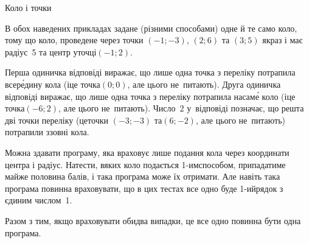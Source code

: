 \begin{problemAllDefault}{Коло і точки}
\Examples
\begin{exampleSimple}{7em}{3em}%
%
\end{exampleSimple}
\begin{exampleSimple}{7em}{3em}%
%
\end{exampleSimple}

\Notes
В обох наведених прикладах задане (різними способами) одне й те само коло, тому що коло, проведене через точки $(-1; -3)$, $(2; 6)$ та $(3; 5)$ якраз і має радіус~5 та центр у\nolinebreak[3] точці\nolinebreak[3] $(-1; 2)$.

Перша одиничка відповіді виражає, що лише одна точка з переліку потрапила всер\'{е}\-дину кола (і\nolinebreak[3] це точка\nolinebreak[3] $(0; 0)$, але цього не~питають). Друга одиничка відповіді виражає, що лише одна точка з переліку потрапила на\nolinebreak[3] сам\'{е} коло (і\nolinebreak[3] це точка\nolinebreak[3] $(-6; 2)$, але цього не~питають). Число~2 у~відповіді позначає, що решта дві точки переліку (це\nolinebreak[3] точки $(-3; -3)$ та\nolinebreak[3] $(6; -2)$, але цього не~питають) потрапили ззовні кола.

Можна здавати програму, яка враховує лише подання кола через координати центра і радіус. На\nolinebreak[3] тести, в\nolinebreak[3] яких коло подається \mbox{1-им}\nolinebreak[3] способом, припадатиме майже половина балів, і така програма може їх отримати. Але навіть така програма повинна враховувати, що в цих тестах все одно буде \mbox{1-ий}\nolinebreak[3] рядок з єдиним числом~1.

Разом з тим, якщо враховувати обидва випадки, це все одно повинна бути одна програма.

\end{problemAllDefault}
